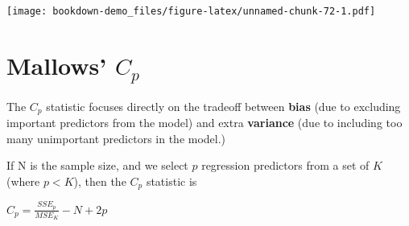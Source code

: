 \documentclass[]{book}
\newenvironment{Shaded}{\begin{snugshade}}{\end{snugshade}}
\newcommand{\KeywordTok}[1]{\textcolor[rgb]{0.13,0.29,0.53}{\textbf{#1}}}
\newcommand{\DataTypeTok}[1]{\textcolor[rgb]{0.13,0.29,0.53}{#1}}
\newcommand{\DecValTok}[1]{\textcolor[rgb]{0.00,0.00,0.81}{#1}}
\newcommand{\FloatTok}[1]{\textcolor[rgb]{0.00,0.00,0.81}{#1}}
\newcommand{\StringTok}[1]{\textcolor[rgb]{0.31,0.60,0.02}{#1}}
\newcommand{\OperatorTok}[1]{\textcolor[rgb]{0.81,0.36,0.00}{\textbf{#1}}}
\newcommand{\NormalTok}[1]{#1}
\theoremstyle{definition}
\theoremstyle{definition}
\theoremstyle{definition}
\theoremstyle{remark}
\begin{document}
\begin{Shaded}
\end{Shaded}

\texttt{[image: bookdown-demo\_files/figure-latex/unnamed-chunk-72-1.pdf]}

\section{\texorpdfstring{Mallows'
\(C_p\)}{Mallows' C\_p}}\label{mallows-c_p}

The \(C_p\) statistic focuses directly on the tradeoff between
\textbf{bias} (due to excluding important predictors from the model) and
extra \textbf{variance} (due to including too many unimportant
predictors in the model.)

If N is the sample size, and we select \(p\) regression predictors from
a set of \(K\) (where \(p < K\)), then the \(C_p\) statistic is

\(C_p = \frac{SSE_p}{MSE_K} - N + 2p\)
\end{document}
